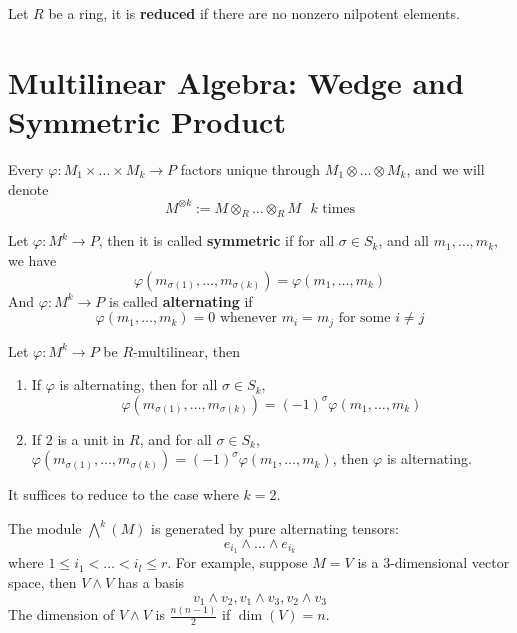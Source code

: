 \documentclass[openany]{book}
\begin{document}
\begin{defn}
    Let $R$ be a ring, it is \textbf{reduced} if there are no nonzero nilpotent elements.
\end{defn}


\section{Multilinear Algebra: Wedge and Symmetric Product}
Every $\varphi:M_1\times\dots\times M_k\to P$ factors unique through $M_1\otimes\dots\otimes M_k$, and we will denote 
\begin{equation*}
    M^{\otimes k}:=M\otimes_R\dots\otimes_R M \text{ $k$ times}
\end{equation*}


\begin{defn}
    Let $\varphi: M^k\to P$, then it is called \textbf{symmetric} if for all $\sigma\in S_k$, and all $m_1,\dots, m_k$, we have 
    \begin{equation*}
        \varphi(m_{\sigma(1)},\dots, m_{\sigma(k)})=\varphi(m_1,\dots, m_k)
    \end{equation*}
    And $\varphi: M^k\to P$ is called \textbf{alternating} if 
    \begin{equation*}
        \varphi(m_1,\dots, m_k)=0 \text{ whenever } m_i=m_j \text{ for some $i\neq j$}
    \end{equation*}
\end{defn}

\begin{prop}
    Let $\varphi:M^k\to P$ be $R$-multilinear, then 
    \begin{enumerate}
        \item If $\varphi$ is alternating, then for all $\sigma\in S_k$, 
        \begin{equation*}
            \varphi(m_{\sigma(1)},\dots, m_{\sigma(k)})=(-1)^\sigma\varphi(m_1,\dots,m_k)
        \end{equation*}
        \item If $2$ is a unit in $R$, and for all $\sigma\in S_k$, $ \varphi(m_{\sigma(1)},\dots, m_{\sigma(k)})=(-1)^\sigma\varphi(m_1,\dots,m_k)$, then $\varphi$ is alternating.
    \end{enumerate}
\end{prop}
It suffices to reduce to the case where $k=2$.


\begin{defn}
    The module $\bigwedge^k(M)$ is generated by pure alternating tensors:
    \begin{equation*}
        e_{i_1}\wedge\dots\wedge e_{i_k}
    \end{equation*}
    where $1\leq i_1<\dots<i_l\leq r$. For example, suppose $M=V$ is a $3$-dimensional vector space, then $V\wedge V$ has a basis 
    \begin{equation*}
        v_1\wedge v_2, v_1\wedge v_3, v_2\wedge v_3
    \end{equation*}
    The dimension of $V\wedge V$ is $\frac{n(n-1)}{2}$ if $\dim(V)=n$.
\end{defn}
\end{document}
